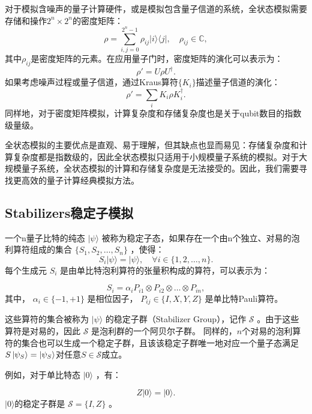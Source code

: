 对于模拟含噪声的量子计算硬件，或是模拟包含量子信道的系统，全状态模拟需要存储和操作$2^n \times 2^n$的密度矩阵：
\begin{equation}
    \rho = \sum_{i,j=0}^{2^n-1} \rho_{ij} |i\rangle\langle j|,
    \quad \rho_{ij} \in \mathbb{C},
\end{equation}
其中$\rho_{ij}$是密度矩阵的元素。在应用量子门时，密度矩阵的演化可以表示为：
\begin{equation}
    \rho' = U \rho U^\dagger.
\end{equation}
如果考虑噪声过程或量子信道，通过Kraus算符$\{K_i\}$描述量子信道的演化：
\begin{equation}
    \rho' = \sum_i K_i \rho K_i^\dagger.
\end{equation}
同样地，对于密度矩阵模拟，计算复杂度和存储复杂度也是关于qubit数目的指数级量级。

全状态模拟的主要优点是直观、易于理解，但其缺点也显而易见：存储复杂度和计算复杂度都是指数级的，因此全状态模拟只适用于小规模量子系统的模拟。对于大规模量子系统，全状态模拟的计算和存储复杂度是无法接受的。因此，我们需要寻找更高效的量子计算经典模拟方法。

\subsection{Stabilizers稳定子模拟}


一个n量子比特的纯态  $|\psi\rangle $ 被称为稳定子态，如果存在一个由n个独立、对易的泡利算符组成的集合  $\{S_1, S_2, …, S_n\}$ ，使得：
\begin{equation}
    S_i |\psi\rangle = |\psi\rangle, \quad \forall i \in \{1, 2, …, n\}.
\end{equation}
每个生成元  $S_i$  是由单比特泡利算符的张量积构成的算符，可以表示为：

\begin{equation}
    S_i = \alpha_i P_{i1} \otimes P_{i2} \otimes … \otimes P_{in},
\end{equation}
其中，  $\alpha_i\in\{-1,+1\}$  是相位因子，  $P_{ij}\in\{I, X, Y, Z\}$  是单比特Pauli算符。


这些算符的集合被称为  $|\psi\rangle $ 的稳定子群（Stabilizer Group），记作 $ \mathcal{S}$ 。由于这些算符是对易的，因此  $\mathcal{S}$  是泡利群的一个阿贝尔子群。
同样的，$n$个对易的泡利算符的集合也可以生成一个稳定子群，且该该稳定子群唯一地对应一个量子态满足$S\ket{\psi_S}=\ket{\psi_S}$对任意$S\in\mathcal{S}$成立。


例如，对于单比特态  $|0\rangle$ ，有：

\begin{equation}
    Z |0\rangle = |0\rangle.
\end{equation}
$|0\rangle$的稳定子群是 $\mathcal{S} = \{I,Z\}$ 。


